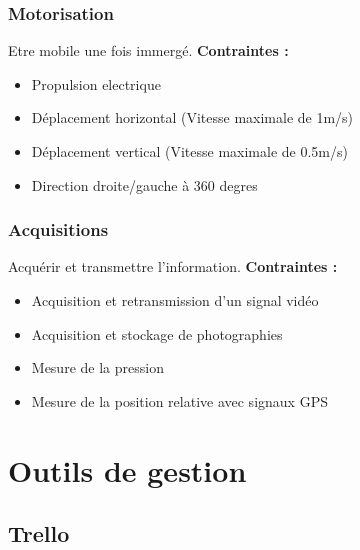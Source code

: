 \documentclass[a4paper,11pt]{report}
\begin{document}
						\subsection{Motorisation}
								Etre mobile une fois immergé. \newline
								\textbf{Contraintes :}
								\begin{itemize}
										\item Propulsion electrique
										\item Déplacement horizontal (Vitesse maximale de 1m/s)
										\item Déplacement vertical (Vitesse maximale de 0.5m/s)
										\item Direction droite/gauche à 360 degres   \newline \newline
								\end{itemize}

						\subsection{Acquisitions}
								Acquérir et transmettre l'information. \newline
								\textbf{Contraintes :}
								\begin{itemize}
										\item Acquisition et retransmission d'un signal vidéo
										\item Acquisition et stockage de photographies
										\item Mesure de la pression
										\item Mesure de la position relative avec signaux GPS
								\end{itemize}
								
								
\chapter{Outils de gestion}

        \section{Trello}
\end{document}
